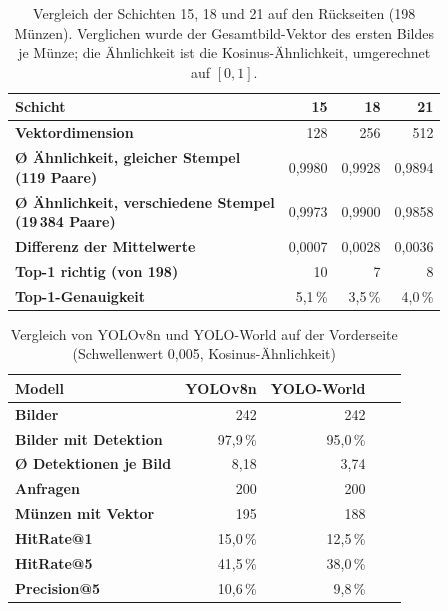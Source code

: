 \begin{table}[H]
\centering
\small
\caption{Vergleich der Schichten 15, 18 und 21 auf den Rückseiten (198 Münzen). Verglichen wurde der Gesamtbild-Vektor des ersten Bildes je Münze; die Ähnlichkeit ist die Kosinus-Ähnlichkeit, umgerechnet auf $[0,1]$.}
\label{tab:schichten-gesamtb-reverse}
\begin{tabular}{|l|r|r|r|}
\hline
\textbf{Schicht}                         & \textbf{15} & \textbf{18} & \textbf{21} \\ \hline
\hline
\textbf{Vektordimension}                         & 128         & 256         & 512         \\ \hline
\makecell[l]{\textbf{Ø Ähnlichkeit, gleicher Stempel}\\\textbf{(119 Paare)}}  & 0{,}9980    & 0{,}9928    & 0{,}9894    \\ \hline
\makecell[l]{\textbf{Ø Ähnlichkeit, verschiedene Stempel}\\\textbf{(19\,384 Paare)}} & 0{,}9973 & 0{,}9900 & 0{,}9858   \\ \hline
\textbf{Differenz der Mittelwerte}               & 0{,}0007    & 0{,}0028    & 0{,}0036    \\ \hline
\textbf{Top-1 richtig (von 198)}                & 10          & 7           & 8           \\ \hline
\textbf{Top-1-Genauigkeit}                       & 5{,}1\,\%   & 3{,}5\,\%   & 4{,}0\,\%   \\ \hline
\end{tabular}
\end{table}

\begin{table}[H]
\centering
\caption{Vergleich von YOLOv8n und YOLO-World auf der Vorderseite (Schwellenwert 0{,}005, Kosinus-Ähnlichkeit)}
\label{tab:modelle_vorderseite}
\begin{tabular}{|l|r|r|r|r|}
\hline
\textbf{Modell} & \textbf{YOLOv8n} & \textbf{YOLO-World} \\ \hline \hline
\textbf{Bilder}                     & 242 & 242 \\ \hline
\textbf{Bilder mit Detektion}       & 97{,}9\,\% & 95{,}0\,\% \\ \hline
\textbf{Ø Detektionen je Bild}      & 8{,}18 & 3{,}74 \\ \hline
\textbf{Anfragen}                   & 200 & 200 \\ \hline
\textbf{Münzen mit Vektor}          & 195 & 188 \\ \hline
\textbf{HitRate@1}                  & 15{,}0\,\% & 12{,}5\,\% \\ \hline
\textbf{HitRate@5}                  & 41{,}5\,\% & 38{,}0\,\% \\ \hline
\textbf{Precision@5}                & 10{,}6\,\% & 9{,}8\,\% \\ \hline
\end{tabular}
\end{table}

